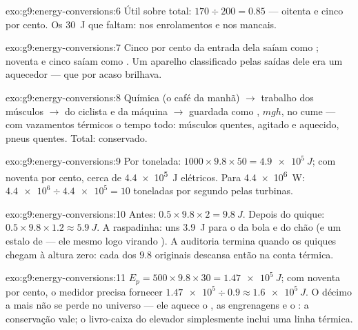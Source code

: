 \begin{solution}{exo:g9:energy-conversions:6}
Útil sobre total: $170 \div 200 = 0.85$ --- oitenta e cinco por
cento. Os \qty{30}{J} que faltam:  nos enrolamentos e nos
mancais.
\end{solution}

\begin{solution}{exo:g9:energy-conversions:7}
Cinco por cento da entrada dela saíam como ; noventa e cinco
saíam como . Um aparelho classificado pelas saídas dele era um
aquecedor --- que por acaso brilhava.
\end{solution}

\begin{solution}{exo:g9:energy-conversions:8}
Química (o café da manhã) $\to$ trabalho dos músculos $\to$  do ciclista e da máquina $\to$ guardada como , $m g h$, no cume --- com vazamentos térmicos o tempo todo:
músculos quentes,  agitado e aquecido, pneus quentes. Total:
conservado.
\end{solution}

\begin{solution}{exo:g9:energy-conversions:9}
Por tonelada: $1000 \times 9.8 \times 50 = \qty{4.9e5}{J}$; com
noventa por cento, cerca de \qty{4.4e5}{J} elétricos. Para
\qty{4.4e6}{W}: $\num{4.4e6} \div \num{4.4e5} = 10$ toneladas por
segundo pelas turbinas.
\end{solution}

\begin{solution}{exo:g9:energy-conversions:10}
Antes: $0.5 \times 9.8 \times 2 = \qty{9.8}{J}$. Depois do quique:
$0.5 \times 9.8 \times 1.2 \approx \qty{5.9}{J}$. A raspadinha: uns
\qty{3.9}{J} para o  da bola e do chão (e um estalo de  ---
ele mesmo logo virando ). A auditoria termina quando os quiques
chegam à altura zero: cada  dos $9.8$ originais descansa então
na conta térmica.
\end{solution}

\begin{solution}{exo:g9:energy-conversions:11}
$E_p = 500 \times 9.8 \times 30 = \qty{1.47e5}{J}$; com noventa por
cento, o medidor precisa fornecer
$\num{1.47e5} \div 0.9 \approx \qty{1.6e5}{J}$. O décimo a mais não
se perde no universo --- ele aquece o , as engrenagens e o :
a conservação vale; o livro-caixa do elevador simplesmente inclui uma
linha térmica.
\end{solution}

